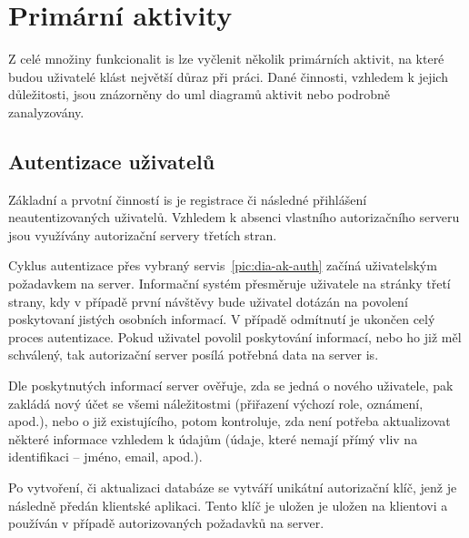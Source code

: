 \section{Primární aktivity}

Z celé množiny funkcionalit \gls{is} lze vyčlenit několik primárních aktivit, na které budou uživatelé klást největší důraz při práci. Dané činnosti, vzhledem k jejich důležitosti, jsou znázorněny do \gls{uml} diagramů aktivit nebo podrobně zanalyzovány.




\subsection{Autentizace uživatelů}

Základní a prvotní činností \gls{is} je registrace či následné přihlášení neautentizovaných uživatelů. Vzhledem k absenci vlastního autorizačního serveru jsou využívány autorizační servery třetích stran.

Cyklus autentizace přes vybraný servis~\ref{pic:dia-ak-auth} začíná uživatelským požadavkem na server. Informační systém přesměruje uživatele na stránky třetí strany, kdy v případě první návštěvy bude uživatel dotázán na povolení poskytovaní jistých osobních informací. V případě odmítnutí je ukončen celý proces autentizace. Pokud uživatel povolil poskytování informací, nebo ho již měl schválený, tak autorizační server posílá potřebná data na server \gls{is}.

Dle poskytnutých informací server ověřuje, zda se jedná o nového uživatele, pak zakládá nový účet se všemi náležitostmi (přiřazení výchozí role, oznámení, apod.), nebo o již existujícího, potom kontroluje, zda není potřeba aktualizovat některé informace vzhledem k údajům (údaje, které nemají přímý vliv na identifikaci -- jméno, email, apod.).

Po vytvoření, či aktualizaci databáze se vytváří unikátní autorizační klíč, jenž je následně předán klientské aplikaci. Tento klíč je uložen je uložen na klientovi a používán v případě autorizovaných požadavků na server.


